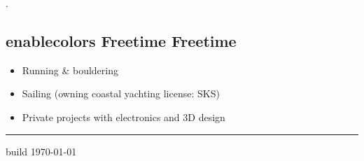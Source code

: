 \documentclass[a4paper,11pt]{article}
\newcommand{\col}[2]{
    \ifcsname enablecolors\endcsname
        \textcolor[HTML]{#1}{#2}
    \else
        #2
    \fi
}
\begin{document}
\begin{minipage}[t]{0.29\textwidth}
    \textcolor[HTML]{ffffff}{.} %
    \begin{flushleft}
        \section*{\col{6c84ac}{Freetime}}
        \begin{itemize}
            \small
            \item Running \& bouldering
            \item Sailing (owning coastal yachting license: SKS)
            \item Private projects with electronics and 3D design
        \end{itemize}
    \end{flushleft}
\end{minipage}

\vfill
\hfill

\hrule
\vspace{0.125cm}

\small build \href{\giturl}{\texttt{\gitcommit}} \hfill \today
\end{document}
